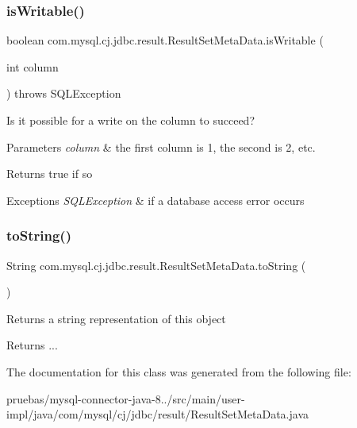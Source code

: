 \subsubsection{\texorpdfstring{is\+Writable()}{isWritable()}}
{\footnotesize\ttfamily boolean com.\+mysql.\+cj.\+jdbc.\+result.\+Result\+Set\+Meta\+Data.\+is\+Writable (\begin{DoxyParamCaption}\item[{int}]{column }\end{DoxyParamCaption}) throws S\+Q\+L\+Exception}

Is it possible for a write on the column to succeed?


\begin{DoxyParams}{Parameters}
{\em column} & the first column is 1, the second is 2, etc.\\
\hline
\end{DoxyParams}
\begin{DoxyReturn}{Returns}
true if so
\end{DoxyReturn}

\begin{DoxyExceptions}{Exceptions}
{\em S\+Q\+L\+Exception} & if a database access error occurs \\
\hline
\end{DoxyExceptions}
\mbox{\label{classcom_1_1mysql_1_1cj_1_1jdbc_1_1result_1_1_result_set_meta_data_a0eafbe5189d19f76e70a011104220551}} 
\subsubsection{\texorpdfstring{to\+String()}{toString()}}
{\footnotesize\ttfamily String com.\+mysql.\+cj.\+jdbc.\+result.\+Result\+Set\+Meta\+Data.\+to\+String (\begin{DoxyParamCaption}{ }\end{DoxyParamCaption})}

Returns a string representation of this object

\begin{DoxyReturn}{Returns}
... 
\end{DoxyReturn}


The documentation for this class was generated from the following file\+:\begin{DoxyCompactItemize}
\item 
pruebas/mysql-\/connector-\/java-\/8../src/main/user-\/impl/java/com/mysql/cj/jdbc/result/Result\+Set\+Meta\+Data.\+java\end{DoxyCompactItemize}
